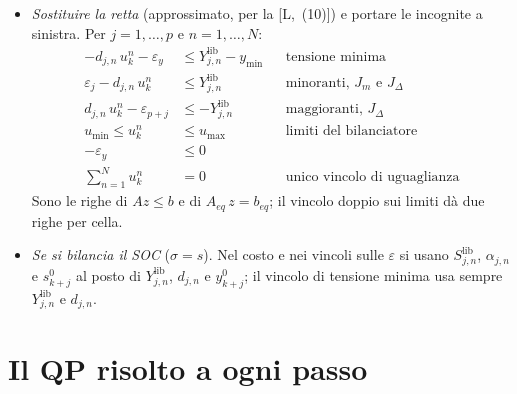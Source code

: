 \documentclass[11pt,a4paper]{article}
\newcommand{\lib}{\mathrm{lib}}
\begin{document}
\begin{itemize}
  \item \emph{Sostituire la retta} (approssimato, per la [L,~(10)]) e portare
        le incognite a sinistra. Per $j = 1, \dots, p$ e $n = 1, \dots, N$:
        \begin{align*}
          -d_{j,n}\,u^n_k - \varepsilon_y &\le Y^\lib_{j,n} - y_{\min}
             && \text{tensione minima} \tag*{[L,~(12)]}\\
          \varepsilon_j - d_{j,n}\,u^n_k &\le Y^\lib_{j,n}
             && \text{minoranti, } J_m \text{ e } J_\Delta \tag*{[L,~(13)]}\\
          d_{j,n}\,u^n_k - \varepsilon_{p+j} &\le -Y^\lib_{j,n}
             && \text{maggioranti, } J_\Delta \tag*{[L,~(14)]}\\
          u_{\min} \le u^n_k &\le u_{\max}
             && \text{limiti del bilanciatore} \tag*{[L,~(15)]}\\
          -\varepsilon_y &\le 0 \tag*{[L,~(16)]}\\
          \textstyle\sum_{n=1}^{N} u^n_k &= 0
             && \text{unico vincolo di uguaglianza} \tag*{[L,~(17)]}
        \end{align*}
        Sono le righe di $A z \le b$ e di $A_{eq}\, z = b_{eq}$; il vincolo
        doppio sui limiti dà due righe per cella.
  \item \emph{Se si bilancia il SOC} ($\sigma = s$). Nel costo e nei vincoli
        sulle $\varepsilon$ si usano $S^\lib_{j,n}$, $\alpha_{j,n}$ e $s^0_{k+j}$
        al posto di $Y^\lib_{j,n}$, $d_{j,n}$ e $y^0_{k+j}$; il vincolo di
        tensione minima usa sempre $Y^\lib_{j,n}$ e $d_{j,n}$.
\end{itemize}

\section{Il QP risolto a ogni passo}\label{sec:qp}
\end{document}
